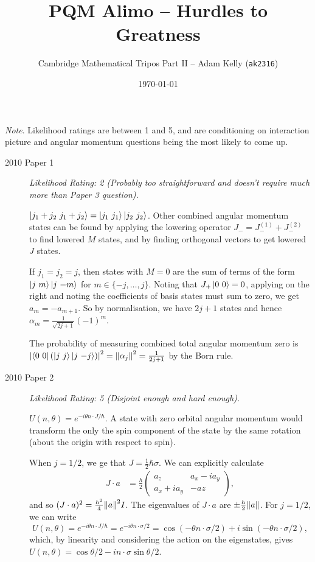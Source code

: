 \documentclass[a4paper]{scrartcl}
\title{PQM Alimo -- Hurdles to Greatness}
\author{Cambridge Mathematical Tripos Part II -- Adam Kelly (\texttt{ak2316})}
\date{\today}
\begin{document}
\maketitle

\emph{Note}. Likelihood ratings are between 1 and 5, and are conditioning on interaction picture and angular momentum questions being the most likely to come up.

\vspace*{\baselineskip}


\begin{description}
    \item[2010 Paper 1] \emph{Likelihood Rating: 2 {\color{gray}(Probably too straightforward and doesn't require much more than Paper 3 question).}}

    $\ket{j_1 + j_2 \ j_1 + j_2} = \ket{j_1 \ j_1} \ket{j_2 \ j_2}$. Other combined angular momentum states can be found by applying the lowering operator $J_- = J_-^{(1)} + J_-^{(2)}$ to find lowered $M$ states, and by finding orthogonal vectors to get lowered $J$ states.
    
    If $j_1 = j_2=j$, then states with $M = 0$ are the sum of terms of the form $\ket{j\ m}\ket{j\ {-}m}$ for $m \in \{-j, \dots, j\}$. Noting that $J_+ \ket{0\ 0} = 0$, applying on the right and noting the coefficients of basis states must sum to zero, we get $a_m = -a_{m+1}$. So by normalisation, we have $2j + 1$ states and hence $\alpha_m = \frac{1}{\sqrt{2j + 1}}(-1)^m$.

    The probability of measuring combined total angular momentum zero is $\abs{\bra{0\ 0}(\ket{j\ j}\ket{j\ {-}j})}^2 = \norm{\alpha_j}^2 = \frac{1}{2j + 1}$ by the Born rule.

    \item[2010 Paper 2] \emph{Likelihood Rating: 5 {\color{gray}(Disjoint enough and hard enough).}}

        $U(n, \theta) = e^{-i \theta n \cdot J / \hbar}$. A state with zero orbital angular momentum would transform the only the spin component of the state by the same rotation (about the origin with respect to spin).

    When $j = 1/2$, we ge that $J = \frac{1}{2}\hbar \sigma$. We can explicitly calculate 
    \begin{align*}
        J \cdot a &= \frac{h}{2} \begin{pmatrix}
            a_z & a_x - i a_y \\ a_x + i a_y & - az
        \end{pmatrix},
    \end{align*}
    and so $(J \cdot a)^2 = \frac{h^2}{4}\norm{a}^2 I$. The eigenvalues of $J \cdot a$ are $\pm \frac{h}{2} \norm{a}$.  For $j = 1/2$, we can write
    $$
    U(n, \theta) = e^{-i \theta n \cdot J / \hbar} = e^{-i \theta n \cdot \sigma/2} = \cos (- \theta n \cdot \sigma/2) + i \sin (- \theta n \cdot \sigma /2),
    $$
    which, by linearity and considering the action on the eigenstates, gives $U(n, \theta) = \cos \theta/2 - i n \cdot \sigma  \sin \theta/2$.


\end{description}
\end{document}
